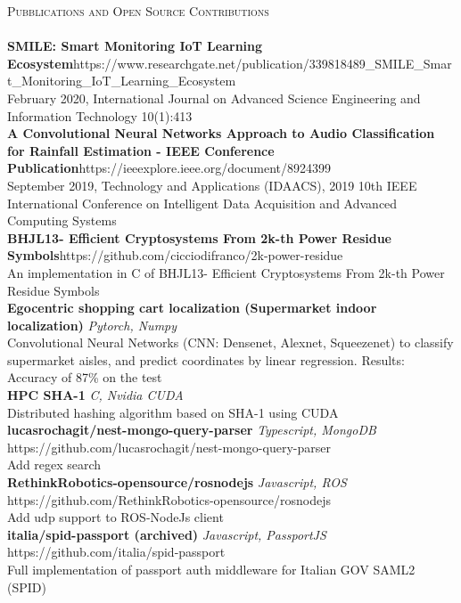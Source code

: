 \documentclass[a4paper]{article}
\newcommand{\lineunder} {
    \vspace*{-8pt} \\
    \hspace*{-18pt} \hrulefill \\
}
\newcommand{\header} [1] {
    {\hspace*{-18pt}\vspace*{6pt} \textsc{#1}}
    \vspace*{-6pt} \lineunder
}
\begin{document}
\header{Pubblications and Open Source Contributions}
{\textbf{SMILE: Smart Monitoring IoT Learning Ecosystem}}\hfill https://www.researchgate.net/publication/339818489\_SMILE\_Smart\_Monitoring\_IoT\_Learning\_Ecosystem\\
February 2020, International Journal on Advanced Science Engineering and Information Technology 10(1):413\\
\vspace*{2mm}
{\textbf{A Convolutional Neural Networks Approach to Audio Classification for Rainfall Estimation - IEEE Conference Publication}}\hfill https://ieeexplore.ieee.org/document/8924399\\
September 2019, Technology and Applications (IDAACS), 2019 10th IEEE International Conference on Intelligent Data Acquisition and Advanced Computing Systems\\
\vspace*{2mm}
{\textbf{BHJL13- Efficient Cryptosystems From 2k-th Power Residue Symbols}}\hfill https://github.com/cicciodifranco/2k-power-residue\\
An implementation in C of BHJL13- Efficient Cryptosystems From 2k-th Power Residue Symbols\\
\vspace*{2mm}
{\textbf{Egocentric shopping cart localization (Supermarket indoor localization)}} {\sl Pytorch, Numpy} \\
Convolutional Neural Networks (CNN: Densenet, Alexnet, Squeezenet) to classify supermarket aisles, and predict coordinates by linear regression. Results: Accuracy of 87\% on the test\\
\vspace*{2mm}
{\textbf{HPC SHA-1}} {\sl C, Nvidia CUDA} \\
Distributed hashing algorithm based on SHA-1 using CUDA\\
\vspace*{2mm}
{\textbf{lucasrochagit/nest-mongo-query-parser}} {\sl Typescript, MongoDB} \hfill https://github.com/lucasrochagit/nest-mongo-query-parser\\
Add regex search\\
\vspace*{2mm}
{\textbf{RethinkRobotics-opensource/rosnodejs}} {\sl Javascript, ROS} \hfill https://github.com/RethinkRobotics-opensource/rosnodejs\\
Add udp support to ROS-NodeJs client\\
\vspace*{2mm}
{\textbf{italia/spid-passport (archived)}} {\sl Javascript, PassportJS} \hfill https://github.com/italia/spid-passport\\
Full implementation of passport auth middleware for Italian GOV SAML2 (SPID)\\
\vspace*{2mm}
\end{document}
